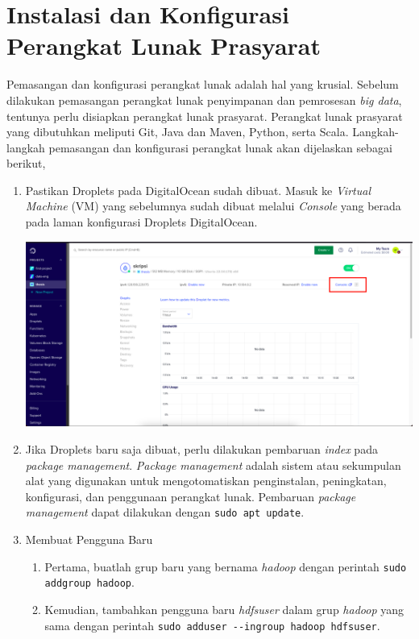 \chapter{Instalasi dan Konfigurasi Perangkat Lunak Prasyarat}
\label{appendix:B}

Pemasangan dan konfigurasi perangkat lunak adalah hal yang krusial. Sebelum dilakukan pemasangan perangkat lunak penyimpanan dan pemrosesan \textit{big data}, tentunya perlu disiapkan perangkat lunak prasyarat. Perangkat lunak prasyarat yang dibutuhkan meliputi Git, Java dan Maven, Python, serta Scala. Langkah-langkah pemasangan dan konfigurasi perangkat lunak akan dijelaskan sebagai berikut,

\begin{enumerate}
  \item Pastikan Droplets pada DigitalOcean sudah dibuat. Masuk ke \textit{Virtual Machine} (VM) yang sebelumnya sudah dibuat melalui \textit{Console} yang berada pada laman konfigurasi Droplets DigitalOcean.
	\begin{center}
	\includegraphics[width=1\linewidth]{figures/ch99/ap1/5.png}
	\end{center} 
  \item Jika Droplets baru saja dibuat, perlu dilakukan pembaruan \textit{index} pada \textit{package management}. \textit{Package management} adalah sistem atau sekumpulan alat yang digunakan untuk mengotomatiskan penginstalan, peningkatan, konfigurasi, dan penggunaan perangkat lunak. Pembaruan \textit{package management} dapat dilakukan dengan \verb|sudo apt update|. 
  \item Membuat Pengguna Baru   \begin{enumerate}
    \item Pertama, buatlah grup baru yang bernama \textit{hadoop} dengan perintah \verb|sudo addgroup hadoop|.
    \item Kemudian, tambahkan pengguna baru \textit{hdfsuser} dalam grup \textit{hadoop} yang sama dengan perintah \verb|sudo adduser --ingroup hadoop hdfsuser|.

\end{enumerate}
\end{enumerate}
